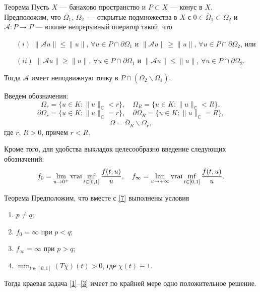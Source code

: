 \documentclass[press]{vestnik}
\begin{document}
\begin{prop}[1]{Теорема} \label{teor-1}
Пусть $X$ --- банахово пространство и $P\subset X$ --- конус в $X$. Предположим, что $\Omega_1$, $\Omega_2$~--- открытые подмножества в $X$ с  $0\in\overline{\Omega}_1\subset \Omega_2$ и $\mathcal{A}:P \to P$ --- вполне непрерывный оператор такой, что
\begin{itemize}
          \item[$(i)$]  $\|\mathcal{A}u\|\leqslant \|u\|$, $\forall u\in P \cap \partial \Omega_1$ и $\|\mathcal{A}u\|\geqslant \|u\|$, $\forall u\in P \cap \partial \Omega_2$, или
          \item[$(ii)$] $\|\mathcal{A}u\|\geqslant \|u\|$, $\forall u\in P \cap \partial \Omega_1$ и $\|\mathcal{A}u\|\leqslant \|u\|$, $\forall u\in P \cap \partial \Omega_2$.
\end{itemize}
Тогда $\mathcal{A}$ имеет неподвижную точку в $P \cap (\overline{\Omega}_2 \backslash \Omega_1)$.
\end{prop}

Введем  обозначения:
\[
\Omega_r = \bigl\{u\in K: \|u\|_{\mathbb{C}} < r \bigr\}, \quad \Omega_R = \bigl\{u\in K: \|u\|_{\mathbb{C}} < R \bigr\},
\]
\[
\partial\Omega_r=\bigl\{u\in K: \|u\|_{\mathbb{C}} = r \bigr\},\quad \partial\Omega_R=\bigl\{u\in K: \|u\|_{\mathbb{C}} = R \bigr\},
\]
\[
\Omega = \overline{ \Omega}_R \backslash \Omega_r,
\]
где $r$, $R>0$, причем $r<R$.

Кроме того, для удобства выкладок целесообразно введение следующих обозначений:
\[
f_0=\lim_{u\rightarrow 0^+}\mathop{\rm vrai}\inf_{t\in[0,1]}\dfrac{f(t,u)}{u}, \quad f_\infty=\lim_{u\rightarrow +\infty}\mathop{\rm vrai}\inf_{t\in[0,1]}\dfrac{f(t,u)}{u}.
\]

\begin{prop}[2]{Теорема} \label{teor-2}
Предположим, что вместе с \eqref{7} выполнены условия
      \begin{enumerate}
          \item $p\neq q$;
          \item $f_0= \infty$ при $p<q$;
          \item $f_\infty= \infty$ при $p>q$;
          \item $\min_{t\in[0,1]}(T\chi)(t)>0$, где $\chi(t)\equiv1$.
      \end{enumerate}
Тогда краевая задача \eqref{1}--\eqref{3} имеет по крайней мере одно положительное решение.
\end{prop}
\end{document}
